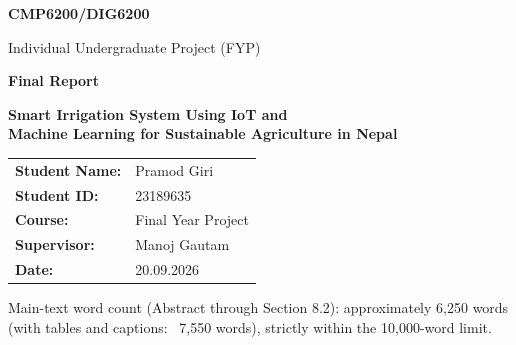 \documentclass[12pt, a4paper]{article}
\begin{document}
\begin{titlepage}
    \centering
    \vspace*{1.5cm}
    {\Large\bfseries CMP6200/DIG6200\par}
    \vspace{0.4cm}
    {\large Individual Undergraduate Project (FYP)\par}
    \vspace{0.4cm}
    {\large\bfseries Final Report\par}
    \vspace{1.8cm}
    {\LARGE\bfseries Smart Irrigation System Using IoT and\\[6pt]
    Machine Learning for Sustainable Agriculture in Nepal\par}
    \vspace{2.2cm}
    \begin{tabular}{ll}
        \textbf{Student Name:} & Pramod Giri    \\[4pt]
        \textbf{Student ID:}   & 23189635       \\[4pt]
        \textbf{Course:}       & Final Year Project \\[4pt]
        \textbf{Supervisor:}   & Manoj Gautam   \\[4pt]
        \textbf{Date:}         & 20.09.2026     \\
    \end{tabular}
    \vfill
    {\small Main-text word count (Abstract through Section 8.2): approximately 6{,}250 words (with tables and captions: ~7{,}550 words), strictly within the 10{,}000-word limit.}
\end{titlepage}

\end{document}
